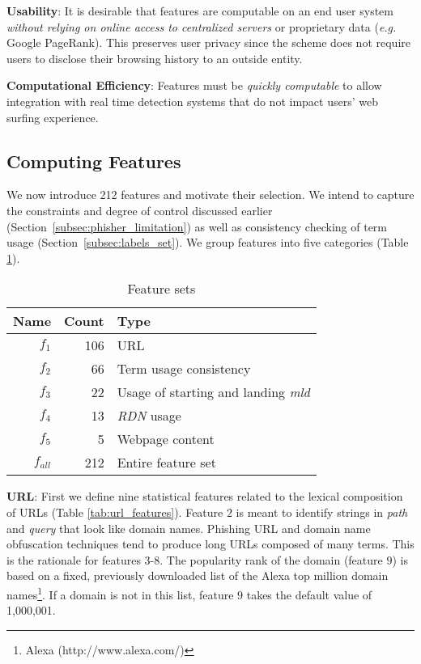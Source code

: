 \documentclass[10pt,conference,compsocconf,letterpaper]{IEEEtran}
\begin{document}
\noindent\textbf{Usability}: It is desirable that features are computable on an end user system \emph{without relying on online access to centralized servers} or proprietary data (\textit{e.g.} Google PageRank). This preserves user privacy since the scheme does not require users to disclose their browsing history to an outside entity. 



\noindent\textbf{Computational Efficiency}: Features must be \emph{quickly computable} to allow integration with real time detection systems that do not impact users' web surfing experience.

\subsection{Computing Features}
\label{subsec:feat_comp}

We now introduce 212 features and motivate their selection. 
We intend to capture the constraints and degree of control discussed earlier (Section~\ref{subsec:phisher_limitation}) as well as consistency checking of term usage (Section~\ref{subsec:labels_set}).
We group features into five categories (Table \ref{tab:feature_type}).

\begin{table}[tbh]
\caption{Feature sets} \centering
\begin{tabular}{r r l}

\textbf{Name} & \textbf{Count}  & \textbf{Type}\\ \hline
$f_1$ & 106 & URL \\
$f_2$ &66 & Term usage consistency \\
$f_3$ &22 & Usage of starting and landing \textit{mld} \\
$f_4$ &13 & \textit{RDN} usage \\
$f_5$ &5 & Webpage content \\ \hline
$f_{all}$ & 212 & Entire feature set

\end{tabular}
\label{tab:feature_type}
\end{table}

\noindent\textbf{URL}: 
First we  define nine statistical features related to the lexical composition of URLs (Table \ref{tab:url_features}). Feature $2$ is meant to identify strings in \emph{path} and \emph{query} that look like domain names. Phishing URL and domain name obfuscation techniques \cite{le:2011:phishdef} tend to produce long URLs composed of many terms. This is the rationale for features $3$-$8$. The popularity rank of the domain (feature $9$) is based on a fixed, previously downloaded list of the Alexa top million domain names\footnote{Alexa (http://www.alexa.com/)}. If a domain is not in this list, feature $9$ takes the default value of 1,000,001.
\end{document}
